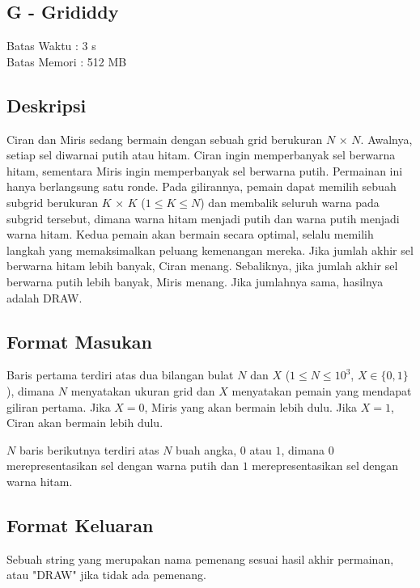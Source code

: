 \documentclass{article}
\begin{document}
\begin{center}
    \section*{G - Grididdy} %
    Batas Waktu : 3 s \\  %
    Batas Memori :  512 MB \\ %
\end{center}

\subsection*{Deskripsi}

Ciran dan Miris sedang bermain dengan sebuah grid berukuran $N$ × $N$. Awalnya, setiap sel diwarnai putih atau hitam. Ciran ingin memperbanyak sel berwarna hitam, sementara Miris ingin memperbanyak sel berwarna putih. Permainan ini hanya berlangsung satu ronde. Pada gilirannya, pemain dapat memilih sebuah subgrid berukuran $K$ × $K$ ($1 \leq K \leq N$) dan membalik seluruh warna pada subgrid tersebut, dimana warna hitam menjadi putih dan warna putih menjadi warna hitam. Kedua pemain akan bermain secara optimal, selalu memilih langkah yang memaksimalkan peluang kemenangan mereka. Jika jumlah akhir sel berwarna hitam lebih banyak, Ciran menang. Sebaliknya, jika jumlah akhir sel berwarna putih lebih banyak, Miris menang. Jika jumlahnya sama, hasilnya adalah DRAW.

\subsection*{Format Masukan}

Baris pertama terdiri atas dua bilangan bulat $N$ dan $X$ ($1 \leq N \leq 10^3$, $X \in \{0,1\}$), dimana $N$ menyatakan ukuran grid dan $X$ menyatakan pemain yang mendapat giliran pertama. Jika $X = 0$, Miris yang akan bermain lebih dulu. Jika $X = 1$, Ciran akan bermain lebih dulu. 

$N$ baris berikutnya terdiri atas $N$ buah angka, $0$ atau $1$, dimana $0$ merepresentasikan sel dengan warna putih dan $1$ merepresentasikan sel dengan warna hitam.

\subsection*{Format Keluaran}

Sebuah string yang merupakan nama pemenang sesuai hasil akhir permainan, atau "DRAW" jika tidak ada pemenang.
\\
\end{document}
